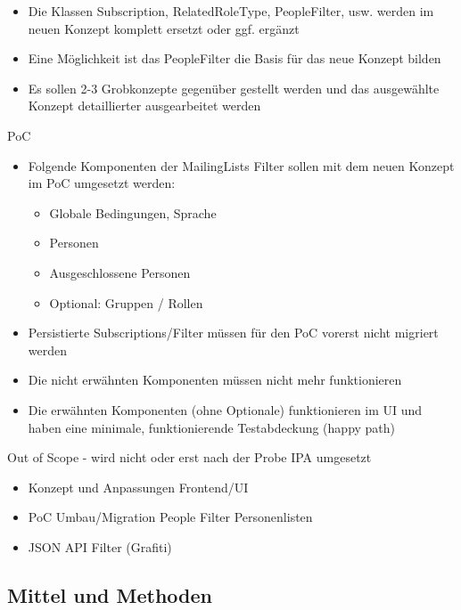 \begin{itemize}
    \item Die Klassen Subscription, RelatedRoleType, PeopleFilter, usw. werden im neuen Konzept komplett ersetzt oder ggf. ergänzt
    \item Eine Möglichkeit ist das PeopleFilter die Basis für das neue Konzept bilden
    \item Es sollen 2-3 Grobkonzepte gegenüber gestellt werden und das ausgewählte Konzept detaillierter ausgearbeitet werden
\end{itemize}

PoC

\begin{itemize}
\item Folgende Komponenten der MailingLists Filter sollen mit dem neuen Konzept im PoC umgesetzt werden:
    \begin{itemize}
        \item Globale Bedingungen, Sprache
        \item Personen
        \item Ausgeschlossene Personen
        \item Optional: Gruppen / Rollen
    \end{itemize}    
\item Persistierte Subscriptions/Filter müssen für den PoC vorerst nicht migriert werden
\item Die nicht erwähnten Komponenten müssen nicht mehr funktionieren
\item Die erwähnten Komponenten (ohne Optionale) funktionieren im UI und haben eine minimale, funktionierende Testabdeckung (happy path)
\end{itemize}

\newpage

Out of Scope - wird nicht oder erst nach der Probe IPA umgesetzt

\begin{itemize}
    \item Konzept und Anpassungen Frontend/UI
    \item PoC Umbau/Migration People Filter Personenlisten
    \item JSON API Filter (Grafiti)
\end{itemize}

\newpage

\subsection{Mittel und Methoden}

